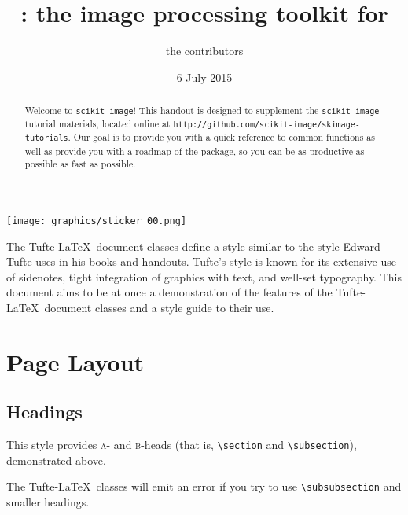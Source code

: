 \documentclass{tufte-handout}
\title{\ski: the image processing toolkit for \sp}
\author[the \ski contributors]{the \ski contributors}
\date{6 July 2015} %
\newcommand{\ski}{\texttt{scikit-image}\xspace}
\begin{document}
\maketitle%

\begin{marginfigure}[-3cm]%
  \texttt{[image: graphics/sticker\_00.png]}
  \label{fig:skimage_logo}
\end{marginfigure}


\begin{abstract}
Welcome to \ski! This handout is designed to supplement the \ski tutorial materials, located online at \texttt{http://github.com/scikit-image/skimage-tutorials}. Our goal is to provide you with a quick reference to common functions as well as provide you with a roadmap of the package, so you can be as productive as possible as fast as possible.
\end{abstract}


The Tufte-\LaTeX\ document classes define a style similar to the
style Edward Tufte uses in his books and handouts.  Tufte's style is known
for its extensive use of sidenotes, tight integration of graphics with
text, and well-set typography.  This document aims to be at once a
demonstration of the features of the Tufte-\LaTeX\ document classes
and a style guide to their use.

\section{Page Layout}\label{sec:page-layout}
\subsection{Headings}\label{sec:headings}
This style provides \textsc{a}- and \textsc{b}-heads (that is,
\Verb|\section| and \Verb|\subsection|), demonstrated above.

The Tufte-\LaTeX\ classes will emit an error if you try to use
\linebreak\Verb|\subsubsection| and smaller headings.
\end{document}
